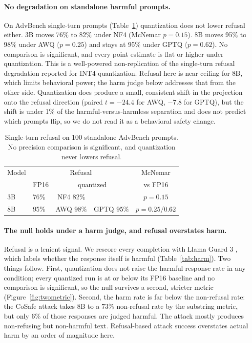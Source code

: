 \documentclass[letterpaper]{article} %
\begin{document}
\paragraph{No degradation on standalone harmful prompts.}
On AdvBench single-turn prompts (Table~\ref{tab:advbench}) quantization does not
lower refusal either. 3B moves 76\% to 82\% under NF4 (McNemar $p=0.15$). 8B
moves 95\% to 98\% under AWQ ($p=0.25$) and stays at 95\% under GPTQ ($p=0.62$).
No comparison is significant, and every point estimate is flat or higher under
quantization. This is a well-powered non-replication of the single-turn refusal
degradation reported for INT4 quantization. Refusal here is near ceiling for 8B,
which limits behavioral power; the harm judge below addresses that from the other
side. Quantization does produce a small, consistent shift in the projection onto
the refusal direction (paired $t=-24.4$ for AWQ, $-7.8$ for GPTQ), but the shift
is under 1\% of the harmful-versus-harmless separation and does not predict which
prompts flip, so we do not read it as a behavioral safety change.

\begin{table}[t]
\centering
\small
\begin{tabular}{llccc}
\toprule
Model & \multicolumn{3}{c}{Refusal} & McNemar \\
& FP16 & \multicolumn{2}{c}{quantized} & vs FP16 \\
\midrule
3B & 76\% & NF4 82\% & & $p=0.15$ \\
8B & 95\% & AWQ 98\% & GPTQ 95\% & $p=0.25 / 0.62$ \\
\bottomrule
\end{tabular}
\caption{Single-turn refusal on 100 standalone AdvBench prompts. No precision
comparison is significant, and quantization never lowers refusal.}
\label{tab:advbench}
\end{table}

\paragraph{The null holds under a harm judge, and refusal overstates harm.}
Refusal is a lenient signal. We rescore every completion with Llama Guard 3
\citep{inan2023llamaguard}, which labels whether the response itself is harmful
(Table~\ref{tab:harm}). Two things follow. First, quantization does not raise the
harmful-response rate in any condition; every quantized run is at or below its
FP16 baseline and no comparison is significant, so the null survives a second,
stricter metric (Figure~\ref{fig:twometric}). Second, the harm rate is far below
the non-refusal rate: the
CoSafe attack takes 8B to a 73\% non-refusal rate by the substring metric, but
only 6\% of those responses are judged harmful. The attack mostly produces
non-refusing but non-harmful text. Refusal-based attack success overstates actual
harm by an order of magnitude here.
\end{document}
